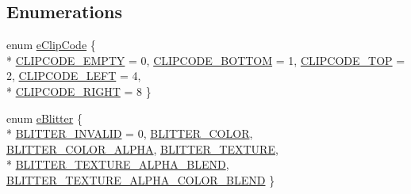 \subsection*{Enumerations}
\begin{DoxyCompactItemize}
\item 
enum \hyperlink{namespaceirr_a346b1626bbed2cac3dc9957bc6cc5e72}{e\-Clip\-Code} \{ \\*
\hyperlink{namespaceirr_a346b1626bbed2cac3dc9957bc6cc5e72a06bb4e3f0e93de59bd903d9d1fb775dd}{C\-L\-I\-P\-C\-O\-D\-E\-\_\-\-E\-M\-P\-T\-Y} = 0, 
\hyperlink{namespaceirr_a346b1626bbed2cac3dc9957bc6cc5e72a94162a78ee6f332a5210ce57db6a767c}{C\-L\-I\-P\-C\-O\-D\-E\-\_\-\-B\-O\-T\-T\-O\-M} = 1, 
\hyperlink{namespaceirr_a346b1626bbed2cac3dc9957bc6cc5e72a574e434577931ebf422c2a3eb94cc06d}{C\-L\-I\-P\-C\-O\-D\-E\-\_\-\-T\-O\-P} = 2, 
\hyperlink{namespaceirr_a346b1626bbed2cac3dc9957bc6cc5e72a6c7c9ccd002dabbba52525457efe2d04}{C\-L\-I\-P\-C\-O\-D\-E\-\_\-\-L\-E\-F\-T} = 4, 
\\*
\hyperlink{namespaceirr_a346b1626bbed2cac3dc9957bc6cc5e72abd01ad58214518c41c17e1bace7ee8aa}{C\-L\-I\-P\-C\-O\-D\-E\-\_\-\-R\-I\-G\-H\-T} = 8
 \}
\item 
enum \hyperlink{namespaceirr_aa14849102f59d5f9d3997a77e4ebfc19}{e\-Blitter} \{ \\*
\hyperlink{namespaceirr_aa14849102f59d5f9d3997a77e4ebfc19a6ba81f3556494ec3344c55eaaf07cdb0}{B\-L\-I\-T\-T\-E\-R\-\_\-\-I\-N\-V\-A\-L\-I\-D} = 0, 
\hyperlink{namespaceirr_aa14849102f59d5f9d3997a77e4ebfc19afed89712a4074704bf2e4771108a9722}{B\-L\-I\-T\-T\-E\-R\-\_\-\-C\-O\-L\-O\-R}, 
\hyperlink{namespaceirr_aa14849102f59d5f9d3997a77e4ebfc19aa754bfab6fc8c11c70543a50834ebf55}{B\-L\-I\-T\-T\-E\-R\-\_\-\-C\-O\-L\-O\-R\-\_\-\-A\-L\-P\-H\-A}, 
\hyperlink{namespaceirr_aa14849102f59d5f9d3997a77e4ebfc19a87cab497b440715578b4d5cc94658c9a}{B\-L\-I\-T\-T\-E\-R\-\_\-\-T\-E\-X\-T\-U\-R\-E}, 
\\*
\hyperlink{namespaceirr_aa14849102f59d5f9d3997a77e4ebfc19a3b1adaf176108937a5dea289675d7073}{B\-L\-I\-T\-T\-E\-R\-\_\-\-T\-E\-X\-T\-U\-R\-E\-\_\-\-A\-L\-P\-H\-A\-\_\-\-B\-L\-E\-N\-D}, 
\hyperlink{namespaceirr_aa14849102f59d5f9d3997a77e4ebfc19aaf100d7c23ee7284686394464ebca601}{B\-L\-I\-T\-T\-E\-R\-\_\-\-T\-E\-X\-T\-U\-R\-E\-\_\-\-A\-L\-P\-H\-A\-\_\-\-C\-O\-L\-O\-R\-\_\-\-B\-L\-E\-N\-D}
 \}
\end{DoxyCompactItemize}
